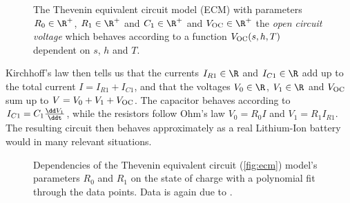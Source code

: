 \documentclass{prettytex/ox/mmsc-special-topic}
\begin{document}
  \begin{figure}[H]
    \centering
    \caption{
      The Thevenin equivalent circuit model (ECM) with parameters $R_0 \in \R^+$, $R_1 \in \R^+$ and $C_1 \in \R^+$ and $V_{\rm OC} \in \R^+$ the \textit{open circuit voltage} which behaves according to a function $V_{\rm OC}(s, h, T)$ dependent on $s$, $h$ and $T$.
    }
    \label{fig:ecm}
  \end{figure}

  Kirchhoff's law then tells us that the currents $I_{R1} \in \R$ and $I_{C1} \in \R$ add up to the total current $I = I_{R1} + I_{C1}$, and that the voltages $V_0 \in \R$, $V_1 \in \R$ and $V_{\rm OC}$ sum up to $V = V_0 + V_1 + V_{\rm OC}$.
  The capacitor behaves according to $I_{C1} = C_1 \frac{\dd V_1}{\ddt}$, while the resistors follow Ohm's law $V_0 = R_0 I$ and $V_1 = R_1 I_{R1}$.
  The resulting circuit then behaves approximately as a real Lithium-Ion battery would in many relevant situations.

  \begin{figure}[H]
    \captionsetup[subfigure]{justification=centering}
    \centering
    \hfill
    \par
    \caption{Dependencies of the Thevenin equivalent circuit (\autoref{fig:ecm}) model's parameters $R_0$ and $R_1$ on the state of charge with a polynomial fit through the data points. Data is again due to \cite{panasonicnums}.}
    \label{fig:parameters}
  \end{figure}
\end{document}
